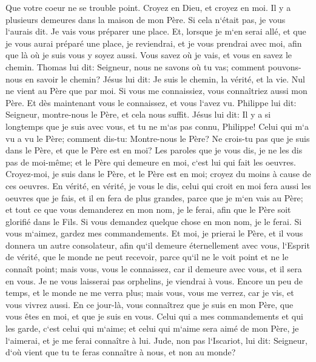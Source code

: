 \verse Que votre coeur ne se trouble point. Croyez en Dieu, et croyez en moi. 
\verse Il y a plusieurs demeures dans la maison de mon Père. Si cela n`était pas, je vous l`aurais dit. Je vais vous préparer une place. 
\verse Et, lorsque je m`en serai allé, et que je vous aurai préparé une place, je reviendrai, et je vous prendrai avec moi, afin que là où je suis vous y soyez aussi. 
\verse Vous savez où je vais, et vous en savez le chemin. 
\verse Thomas lui dit: Seigneur, nous ne savons où tu vas; comment pouvons-nous en savoir le chemin? 
\verse Jésus lui dit: Je suis le chemin, la vérité, et la vie. Nul ne vient au Père que par moi. 
\verse Si vous me connaissiez, vous connaîtriez aussi mon Père. Et dès maintenant vous le connaissez, et vous l`avez vu. 
\verse Philippe lui dit: Seigneur, montre-nous le Père, et cela nous suffit. 
\verse Jésus lui dit: Il y a si longtemps que je suis avec vous, et tu ne m`as pas connu, Philippe! Celui qui m`a vu a vu le Père; comment dis-tu: Montre-nous le Père? 
\verse Ne crois-tu pas que je suis dans le Père, et que le Père est en moi? Les paroles que je vous dis, je ne les dis pas de moi-même; et le Père qui demeure en moi, c`est lui qui fait les oeuvres. 
\verse Croyez-moi, je suis dans le Père, et le Père est en moi; croyez du moins à cause de ces oeuvres. 
\verse En vérité, en vérité, je vous le dis, celui qui croit en moi fera aussi les oeuvres que je fais, et il en fera de plus grandes, parce que je m`en vais au Père; 
\verse et tout ce que vous demanderez en mon nom, je le ferai, afin que le Père soit glorifié dans le Fils. 
\verse Si vous demandez quelque chose en mon nom, je le ferai. 
\verse Si vous m`aimez, gardez mes commandements. 
\verse Et moi, je prierai le Père, et il vous donnera un autre consolateur, afin qu`il demeure éternellement avec vous, 
\verse l`Esprit de vérité, que le monde ne peut recevoir, parce qu`il ne le voit point et ne le connaît point; mais vous, vous le connaissez, car il demeure avec vous, et il sera en vous. 
\verse Je ne vous laisserai pas orphelins, je viendrai à vous. 
\verse Encore un peu de temps, et le monde ne me verra plus; mais vous, vous me verrez, car je vis, et vous vivrez aussi. 
\verse En ce jour-là, vous connaîtrez que je suis en mon Père, que vous êtes en moi, et que je suis en vous. 
\verse Celui qui a mes commandements et qui les garde, c`est celui qui m`aime; et celui qui m`aime sera aimé de mon Père, je l`aimerai, et je me ferai connaître à lui. 
\verse Jude, non pas l`Iscariot, lui dit: Seigneur, d`où vient que tu te feras connaître à nous, et non au monde? 

